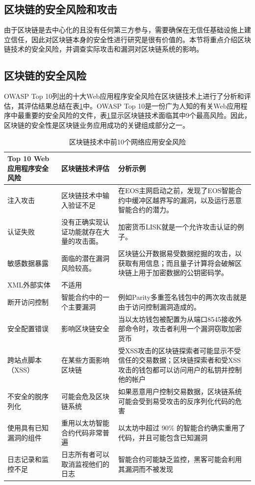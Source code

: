 \begin{translation}
\section{区块链的安全风险和攻击}

由于区块链是去中心化的且没有任何第三方参与，需要确保在无信任基础设施上建立信任，因此对区块链本身的安全性进行研究是很有价值的。本节将重点介绍区块链技术的安全风险，并调查实际攻击和漏洞对区块链系统的影响。

\subsection{区块链的安全风险}
OWASP Top 10列出的十大Web应用程序安全风险在区块链技术上进行了分析和评估\cite{art54}，其评估结果总结在表\ref{tab:区块链技术中前10个网络应用安全风险}中。OWASP Top 10是一份广为人知的有关Web应用程序中最重要的安全风险的文件，表\ref{tab:区块链技术中前10个网络应用安全风险}显示区块链技术面临其中9个最高风险。因此，区块链的安全性是区块链业务应用成功的关键组成部分之一。

\begin{longtable}[H] 
{|p{3cm}|p{3.5cm}|p{6cm}|} 
    \caption{区块链技术中前10个网络应用安全风险\cite{art54}} 
    \label{tab:区块链技术中前10个网络应用安全风险} \\
    \hline Top 10 Web应用程序安全风险 & 区块链技术评估 & 分析示例 \\ 
    \hline 注入攻击 & 区块链技术中输入验证不足 & 在EOS主网启动之前，发现了EOS智能合约中缓冲区越界写的漏洞，以及运行恶意智能合约的潜力。 \\ 
    \hline 认证失败 & 没有正确实现认证功能就存在大量的攻击面。 & 加密货币LISK就是一个允许攻击认证的例子。 \\ 
    \hline 敏感数据暴露 & 面临的潜在漏洞风险较高。 & 区块链公开数据易受数据挖掘的攻击，以获取有用信息；而且量子计算将会破解区块链上用于加密数据的公钥密码学。 \\ 
    \hline XML外部实体 & 不适用 & \\ 
    \hline 断开访问控制 & 智能合约中的一个主要漏洞 & 例如Parity多重签名钱包中的两次攻击就是由于访问控制漏洞造成的。 \\ 
    \hline 安全配置错误 & 影响区块链安全 & 当以太坊钱包被配置为从端口8545接收外部命令时，攻击者利用一个漏洞窃取加密货币 \\ 
    \hline 跨站点脚本（XSS） & 在某些方面影响区块链 & 受XSS攻击的区块链探索者可能显示不受信任的交易数据；区块链探索者和受XSS攻击的钱包都可以访问用户的私钥并控制他的帐户 \\ 
    \hline 不安全的脱序列化 & 可能会危及区块链系统 & 如果恶意用户控制交易数据，区块链系统可能会受到易受攻击的反序列化代码的危害 \\ \hline 使用具有已知漏洞的组件 & 重用以太坊智能合约代码非常普遍 & 以太坊中超过 90\% 的智能合约确实重用了代码，并且可能包含已知漏洞 \\ 
    \hline 日志记录和监控不足 & 日志所有者可以取消监视他们的日志 & 智能合约可能缺乏监控，黑客可能会利用其漏洞而不被发现 \\ 
    \hline 
\end{longtable}



\end{translation}

